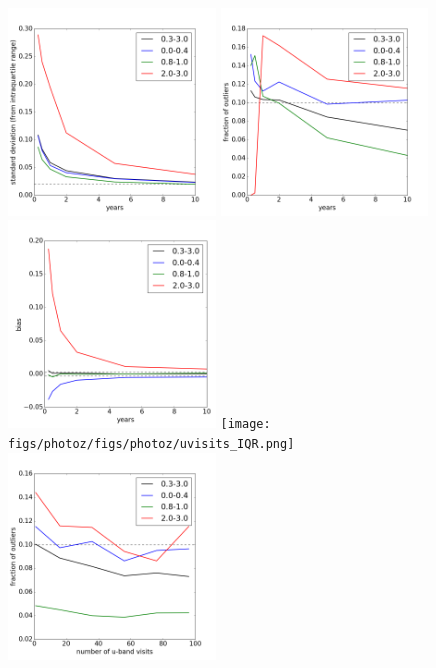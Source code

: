 \begin{figure}[h]
\begin{center}
\includegraphics[width=5.5cm]{figs/photoz/nyears_IQR.png}
\includegraphics[width=5.5cm]{figs/photoz/nyears_fout.png}
\includegraphics[width=5.5cm]{figs/photoz/nyears_bias.png}
\texttt{[image: figs/photoz/figs/photoz/uvisits\_IQR.png]}
\includegraphics[width=5.5cm]{figs/photoz/uvisits_fout.png}

\end{center}
\end{figure}
